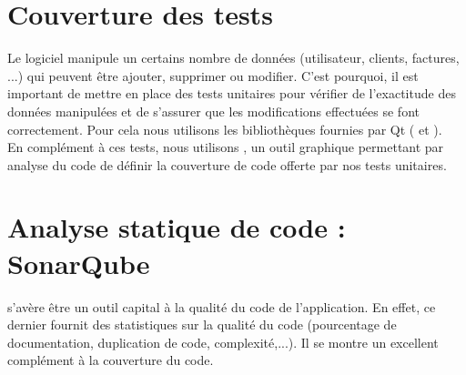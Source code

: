 \section{Couverture des tests}
Le logiciel \FactDev manipule un certains nombre de données (utilisateur, clients, factures, ...) qui peuvent être ajouter, supprimer ou modifier. C'est pourquoi, il est important de mettre en place des tests unitaires pour vérifier de l'exactitude des données manipulées et de s'assurer que les modifications effectuées se font correctement. Pour cela nous utilisons les bibliothèques fournies par Qt ( et ). \\
En complément à ces tests, nous utilisons , un outil graphique permettant par analyse du code de définir la couverture de code offerte par nos tests unitaires. 
\section{Analyse statique de code : SonarQube}
 s'avère être un outil capital à la qualité du code de l'application. En effet, ce dernier fournit des statistiques sur la qualité du code (pourcentage de documentation, duplication de code, complexité,...). Il se montre un excellent complément à la couverture du code.  